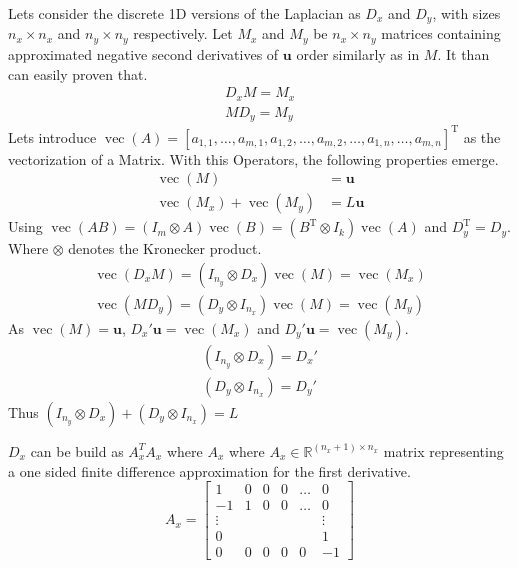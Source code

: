 \documentclass{article}
\begin{document}
Lets consider the discrete 1D versions of the Laplacian as $D_x$ and $D_y$, with sizes $n_x \times n_x$ and $n_y \times n_y$ respectively.
Let $M_x$ and $M_y$ be $n_x\times n_y$ matrices containing approximated negative second derivatives of $\mathbf{u}$ order similarly as in $M$. It than can easily proven that.
\begin{align}
    D_x M = M_x \\
    M D_y = M_y
\end{align}
Lets introduce $\operatorname{vec}(A)=\left[a_{1,1}, \ldots, a_{m, 1}, a_{1,2}, \ldots, a_{m, 2}, \ldots, a_{1, n}, \ldots, a_{m, n}\right]^{\mathrm{T}}$ as the vectorization of a Matrix. With this Operators, the following properties emerge.
\begin{align}
    \operatorname{vec}(M) &= \mathbf{u} \\
    \operatorname{vec}(M_x) + \operatorname{vec}(M_y) &= L\mathbf{u}
\end{align}
Using $\operatorname{vec}(A B)=\left(I_{m} \otimes A\right) \operatorname{vec}(B)=\left(B^{\mathrm{T}} \otimes I_{k}\right) \operatorname{vec}(A)$ and $D_y^{\mathrm{T}} = D_y$. Where $\otimes$ denotes the Kronecker product.
\begin{align}
    \operatorname{vec}(D_x M) = (I_{n_y} \otimes D_x)\operatorname{vec}(M) = \operatorname{vec}(M_x)\\
    \operatorname{vec}(M D_y) = (D_y \otimes I_{n_x})\operatorname{vec}(M) = \operatorname{vec}(M_y)
\end{align} 
As $\operatorname{vec}(M) = \mathbf{u}$, $D_x' \mathbf{u} = \operatorname{vec}(M_x)$ and $D_y' \mathbf{u} = \operatorname{vec}(M_y)$.
\begin{align}
    (I_{n_y} \otimes D_x) = D_x' \\
    (D_y \otimes I_{n_x}) = D_y'
\end{align}
Thus $(I_{n_y} \otimes D_x) + (D_y \otimes I_{n_x}) = L$\par
$D_x$ can be build as $A_x^T A_x$ where $A_x$ where $A_x \in \mathbb{R}^{(n_x+1) \times n_x}$ matrix representing a one sided finite difference approximation for the first derivative.
\begin{equation}
	 A_x = 
     \begin{bmatrix}{1} & {0} & {0} & {0} & {\ldots} & {0} \\ {-1} & {1} & {0} & {0} & {\ldots} & {0} \\ {\vdots} & {} & {} & {} & {} & {\vdots} \\ {0} & {} & {} & {} & {} & {1} \\ {0} & {0} & {0} & {0} & {0} & {-1}\end{bmatrix}
\end{equation}
\end{document}
